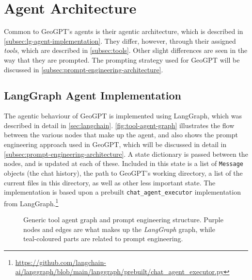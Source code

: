 \section{Agent Architecture}
\label{sec:agent-architecture}

Common to GeoGPT's agents is their agentic architecture, which is described in \autoref{subsec:lg-agent-implementation}. They differ, however, through their assigned \textit{tools}, which are described in \autoref{subsec:tools}. Other slight differences are seen in the way that they are prompted. The prompting strategy used for GeoGPT will be discussed in \autoref{subsec:prompt-engineering-architecture}.

\subsection{LangGraph Agent Implementation}
\label{subsec:lg-agent-implementation}

The agentic behaviour of GeoGPT is implemented using LangGraph, which was described in detail in \autoref{sec:langchain}. \autoref{fig:tool-agent-graph} illustrates the flow between the various nodes that make up the agent, and also shows the prompt engineering approach used in GeoGPT, which will be discussed in detail in \autoref{subsec:prompt-engineering-architecture}. A state dictionary is passed between the nodes, and is updated at each of these. Included in this state is a list of \texttt{Message} objects (the chat history), the path to GeoGPT's working directory, a list of the current files in this directory, as well as other less important state. The implementation is based upon a prebuilt \texttt{chat\_agent\_executor} implementation from LangGraph.\footnote{\url{https://github.com/langchain-ai/langgraph/blob/main/langgraph/prebuilt/chat_agent_executor.py}}

\begin{figure}
    \centering
    \caption{Generic tool agent graph and prompt engineering structure. Purple nodes and edges are what makes up the \textit{LangGraph} graph, while teal-coloured parts are related to prompt engineering.}
    \label{fig:tool-agent-graph}
\end{figure}


